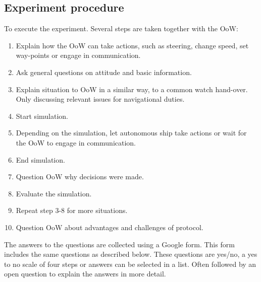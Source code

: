 \subsection{Experiment procedure}
To execute the experiment. Several steps are taken together with the \acf{OoW}:
\begin{enumerate}
	\item Explain how the OoW can take actions, such as steering, change speed, set way-points or engage in communication.
	\item Ask general questions on attitude and basic information.
	\item Explain situation to OoW in a similar way, to a common watch hand-over. Only discussing relevant issues for navigational duties.
	\item Start simulation.
	\item Depending on the simulation, let autonomous ship take actions or wait for the OoW to engage in communication.
	\item End simulation.
	\item Question OoW why decisions were made.
	\item Evaluate the simulation.
	\item Repeat step 3-8 for more situations.
	\item Question OoW about advantages and challenges of protocol.
\end{enumerate}
The answers to the questions are collected using a Google form. This form includes the same questions as described below. These questions are yes/no, a yes to no scale of four steps or answers can be selected in a list. Often followed by an open question to explain the answers in more detail. 


